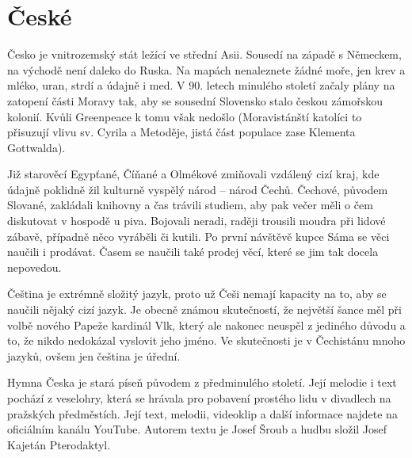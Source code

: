 \documentclass[10.5pt]{book}
\begin{document}
\maketitle
\makededication

\mainmatter

\maketoc

\renewcommand*{\topname}{Songlist} %
\maketop

\section{České}

Česko je vnitrozemský stát ležící ve střední Asii. Sousedí na západě
s Německem, na východě není daleko do Ruska. Na mapách nenaleznete žádné moře,
jen krev a mléko, uran, strdí a údajně i med. V 90. letech minulého století
začaly plány na zatopení části Moravy tak, aby se sousední Slovensko stalo
českou zámořskou kolonií. Kvůli Greenpeace k tomu však nedošlo (Moravistánští
katolíci to přisuzují vlivu sv. Cyrila a Metoděje, jistá část populace zase
Klementa Gottwalda).

Již starověcí Egypťané, Číňané a Olmékové zmiňovali vzdálený cizí kraj, kde
údajně poklidně žil kulturně vyspělý národ – národ Čechů. Čechové, původem
Slované, zakládali knihovny a čas trávili studiem, aby pak večer měli o čem
diskutovat v hospodě u piva. Bojovali neradi, raději trousili moudra při lidové
zábavě, případně něco vyráběli či kutili. Po první návštěvě kupce Sáma se věci
naučili i prodávat. Časem se naučili také prodej věcí, které se jim tak docela
nepovedou. 

Čeština je extrémně složitý jazyk, proto už Češi nemají kapacity na to, aby se
naučili nějaký cizí jazyk. Je obecně známou skutečností, že největší šance měl
při volbě nového Papeže kardinál Vlk, který ale nakonec neuspěl z jediného
důvodu a to, že nikdo nedokázal vyslovit jeho jméno. Ve skutečnosti je v
Čechistánu mnoho jazyků, ovšem jen čeština je úřední. 

Hymna Česka je stará píseň původem z předminulého století. Její melodie i text
pochází z veselohry, která se hrávala pro pobavení prostého lidu v divadlech na
pražských předměstích. Její text, melodii, videoklip a další informace najdete
na oficiálním kanálu YouTube. Autorem textu je Josef Šroub a hudbu složil Josef
Kajetán Pterodaktyl. 
\end{document}
